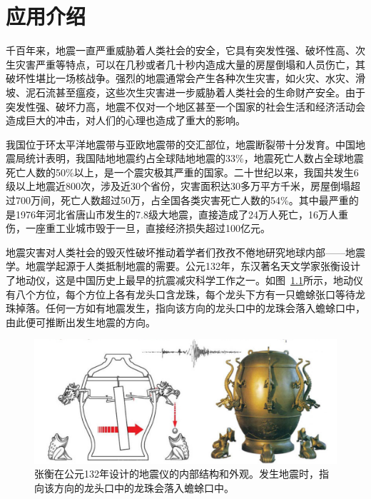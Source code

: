 \documentclass[degree=doctor]{thuthesis}
\begin{document}
%



%
% 
% 
% 
% 
% 
% 



\chapter{应用介绍}
千百年来，地震一直严重威胁着人类社会的安全，它具有突发性强、破坏性高、次生灾害严重等特点，可以在几秒或者几十秒内造成大量的房屋倒塌和人员伤亡，其破坏性堪比一场核战争。强烈的地震通常会产生各种次生灾害，如火灾、水灾、滑坡、泥石流甚至瘟疫，这些次生灾害进一步威胁着人类社会的生命财产安全。由于突发性强、破坏力高，地震不仅对一个地区甚至一个国家的社会生活和经济活动会造成巨大的冲击，对人们的心理也造成了重大的影响。

我国位于环太平洋地震带与亚欧地震带的交汇部位，地震断裂带十分发育。中国地震局统计表明，我国陆地地震约占全球陆地地震的33\%，地震死亡人数占全球地震死亡人数的50\%以上，是一个震灾极其严重的国家\cite{地震局}。二十世纪以来，我国共发生6级以上地震近800次，涉及近30个省份，灾害面积达30多万平方千米，房屋倒塌超过700万间，死亡人数超过50万，占全国各类灾害死亡人数的54\%。其中最严重的是1976年河北省唐山市发生的7.8级大地震，直接造成了24万人死亡，16万人重伤，一座重工业城市毁于一旦，直接经济损失超过100亿元\cite{地震局}。

地震灾害对人类社会的毁灭性破坏推动着学者们孜孜不倦地研究地球内部——地震学。地震学起源于人类抵制地震的需要。公元132年，东汉著名天文学家张衡设计了地动仪，这是中国历史上最早的抗震减灾科学工作之一\citep{stein2009introduction}。如图~\ref{fig:heng-scope}所示，地动仪有八个方位，每个方位上各有龙头口含龙珠，每个龙头下方有一只蟾蜍张口等待龙珠掉落。任何一方如有地震发生，指向该方向的龙头口中的龙珠会落入蟾蜍口中，由此便可推断出发生地震的方向\cite{seismoscopewiki}。

\begin{figure}[ht]
\centering
\includegraphics[width=0.7\columnwidth]{seismoscope.png}
\caption{张衡在公元132年设计的地震仪的内部结构和外观\citep{hsiao2009review}。发生地震时，指向该方向的龙头口中的龙珠会落入蟾蜍口中。}
\label{fig:heng-scope}
\end{figure}
\end{document}
